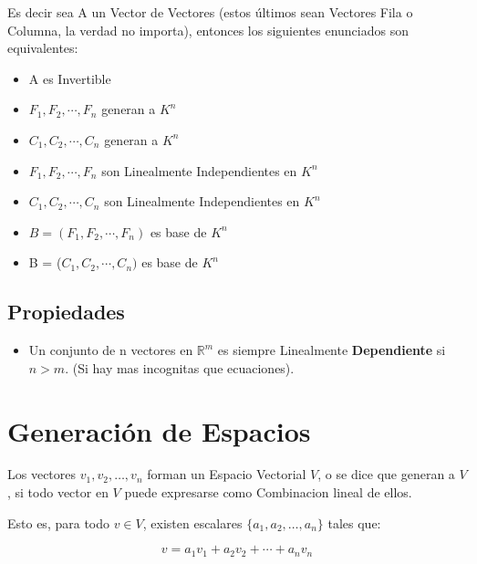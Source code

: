 \documentclass[12pt]{report}							    %
\begin{document}
        Es decir sea A un Vector de Vectores (estos últimos sean Vectores Fila
        o Columna, la verdad no importa), entonces los siguientes
        enunciados son equivalentes:

        \begin{itemize}
            \item A es Invertible
            \item $F_1, F_2, \cdots ,F_n$ generan a $K^n$
            \item $C_1, C_2, \cdots, C_n$ generan a $K^n$
            \item $F_1, F_2, \cdots, F_n$ son Linealmente Independientes en $K^n$
            \item $C_1, C_2, \cdots, C_n$ son Linealmente Independientes en $K^n$
            \item $B = (F_1, F_2, \cdots, F_n)$ es base de $K^n$
            \item B = ($C_1, C_2, \cdots, C_n)$ es base de $K^n$
        \end{itemize}
        

        \subsection{Propiedades}
        \begin{itemize}
            \item Un conjunto de n vectores en $\mathbb{R}^m$ es siempre Linealmente
             \textbf{Dependiente} si $n > m$. (Si hay mas incognitas que ecuaciones).
        \end{itemize}



    \clearpage
    \section{Generación de Espacios}
        Los vectores $v_1,v_2,\dots,v_n$ forman un Espacio Vectorial $V$, o se dice
        que  generan a $V$, si todo vector en $V$ puede expresarse como Combinacion lineal de ellos.


        Esto es, para todo $v \in V$, existen escalares $\{a_1,a_2,\dots,a_n\}$ tales que:

        \begin{equation}
            v = a_1v_1 + a_2v_2 + \cdots + a_nv_n
        \end{equation}
\end{document}
